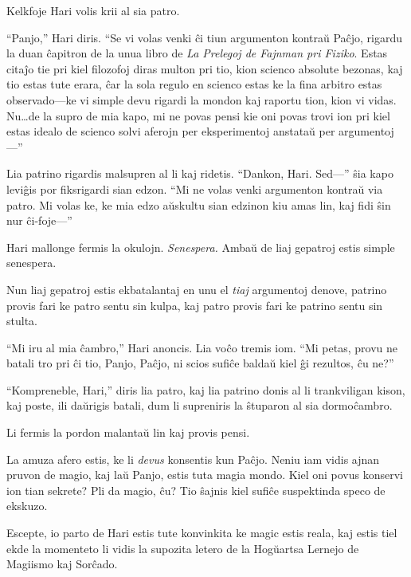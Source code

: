 Kelkfoje Hari volis krii al sia patro.

“Panjo,” Hari diris.
“Se vi volas venki ĉi tiun argumenton kontraŭ Paĉjo, rigardu la duan ĉapitron de la unua libro de \emph{La Prelegoj de Fajnman pri Fiziko}.
Estas citaĵo tie pri kiel filozofoj diras multon pri tio, kion scienco absolute bezonas, kaj tio estas tute erara, ĉar la sola regulo en scienco estas ke la fina arbitro estas observado—ke vi simple devu rigardi la mondon kaj raportu tion, kion vi vidas.
Nu…de la supro de mia kapo, mi ne povas pensi kie oni povas trovi ion pri kiel estas idealo de scienco solvi aferojn per eksperimentoj anstataŭ per argumentoj—”

Lia patrino rigardis malsupren al li kaj ridetis.
“Dankon, Hari.
Sed—” ŝia kapo leviĝis por fiksrigardi sian edzon.
“Mi ne volas venki argumenton kontraŭ via patro.
Mi volas ke, ke mia edzo aŭskultu sian edzinon kiu amas lin, kaj fidi ŝin nur ĉi-foje—”

Hari mallonge fermis la okulojn.
\emph{Senespera.}
Ambaŭ de liaj gepatroj estis simple senespera.

Nun liaj gepatroj estis ekbatalantaj en unu el \emph{tiaj} argumentoj denove, patrino provis fari ke patro sentu sin kulpa, kaj patro provis fari ke patrino sentu sin stulta.

“Mi iru al mia ĉambro,” Hari anoncis.
Lia voĉo tremis iom.
“Mi petas, provu ne batali tro pri ĉi tio, Panjo, Paĉjo, ni scios sufiĉe baldaŭ kiel ĝi rezultos, ĉu ne?”

“Kompreneble, Hari,” diris lia patro, kaj lia patrino donis al li trankviligan kison, kaj poste, ili daŭrigis batali, dum li supreniris la ŝtuparon al sia dormoĉambro.

Li fermis la pordon malantaŭ lin kaj provis pensi.

La amuza afero estis, ke li \emph{devus} konsentis kun Paĉjo.
Neniu iam vidis ajnan pruvon de magio, kaj laŭ Panjo, estis tuta magia mondo.
Kiel oni povus konservi ion tian sekrete?
Pli da magio, ĉu?
Tio ŝajnis kiel sufiĉe suspektinda speco de ekskuzo.


Escepte, io parto de Hari estis tute konvinkita ke magic estis reala, kaj estis tiel ekde la momenteto li vidis la supozita letero de la Hogŭartsa Lernejo de Magiismo kaj Sorĉado.

